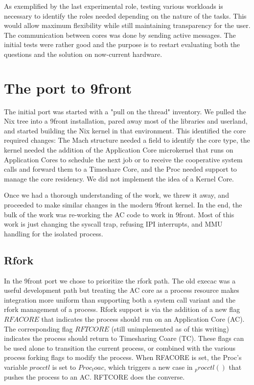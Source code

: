 \documentclass{article}
\begin{document}
As exemplified by the last experimental role, testing various workloads is necessary to identify the roles needed depending on the nature of the tasks.  This would allow maximum flexibility while still maintaining transparency for the user.
The communication between cores was done by sending active messages.
The initial tests were rather good and the purpose is to restart evaluating both the questions and the solution on now-current hardware.
\section{The port to 9front}
The initial port was started with a "pull on the thread" inventory.
We pulled the Nix tree into a 9front installation, pared away most of the libraries and userland, and started building the Nix kernel in that environment.
This identified the core required changes: The Mach structure needed a field to identify the core type, the kernel needed the addition of the Application Core microkernel that runs on Application Cores to schedule the next job or to receive the cooperative system calls and forward them to a Timeshare Core, and the Proc needed support to manage the core residency.
We did not implement the idea of a Kernel Core.

Once we had a thorough understanding of the work, we threw it away, and proceeded to make similar changes in the modern 9front kernel.
In the end, the bulk of the work was re-working the AC code to work in 9front.
Most of this work is just changing the syscall trap, refusing IPI interrupts, and MMU handling for the isolated process.
\subsection{Rfork}
In the 9front port we chose to prioritize the rfork path.
The old execac was a useful development path but treating the AC core as a process resource makes integration more uniform than supporting both a system call variant and the rfork management of a process.
Rfork support is via the addition of a new flag $RFACORE$ that indicates the process should run on an Application Core (AC).
The corresponding flag $RFTCORE$ (still unimplemented as of this writing) indicates the process should return to Timesharing Coare (TC).
These flags can be used alone to transition the current process, or combined with the various process forking flags to modify the process.
When RFACORE is set, the Proc's variable $procctl$ is set to $Proc_toac$, which triggers a new case in $_procctl()$ that pushes the process to an AC.
RFTCORE does the converse.
\end{document}
